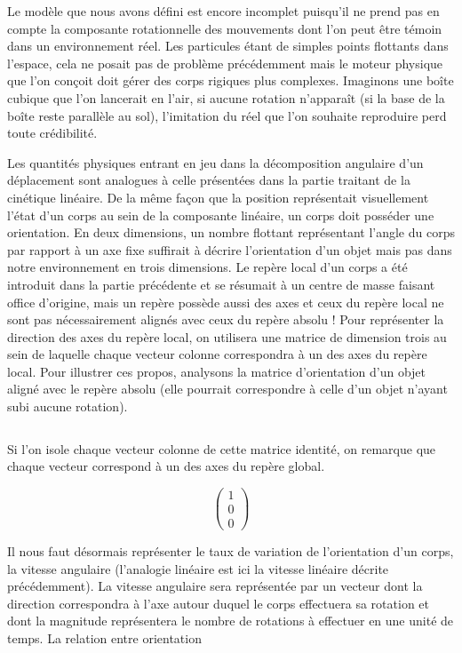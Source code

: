 Le modèle que nous avons défini est encore incomplet puisqu'il ne prend pas en compte la composante rotationnelle des mouvements dont l'on peut être témoin dans un environnement réel. Les particules étant de simples points flottants dans l'espace, cela ne posait pas de problème précédemment mais le moteur physique que l'on conçoit doit gérer des corps rigiques plus complexes. Imaginons une boîte cubique que l'on lancerait en l'air, si aucune rotation n'apparaît (si la base de la boîte reste parallèle au sol), l'imitation du réel que l'on souhaite reproduire perd toute crédibilité.

Les quantités physiques entrant en jeu dans la décomposition angulaire d'un déplacement sont analogues à celle présentées dans la partie traitant de la cinétique linéaire. De la même façon que la position représentait visuellement l'état d'un corps au sein de la composante linéaire, un corps doit posséder une orientation. En deux dimensions, un nombre flottant représentant l'angle du corps par rapport à un axe fixe suffirait à décrire l'orientation d'un objet mais pas dans notre environnement en trois dimensions. Le repère local d'un corps a été introduit dans la partie précédente et se résumait à un centre de masse faisant office d'origine, mais un repère possède aussi des axes et ceux du repère local ne sont pas nécessairement alignés avec ceux du repère absolu ! Pour représenter la direction des axes du repère local, on utilisera une matrice de dimension trois au sein de laquelle chaque vecteur colonne correspondra à un des axes du repère local. Pour illustrer ces propos, analysons la matrice d'orientation d'un objet aligné avec le repère absolu (elle pourrait correspondre à celle d'un objet n'ayant subi aucune rotation).

\[
\]

Si l'on isole chaque vecteur colonne de cette matrice identité, on remarque que chaque vecteur correspond à un des axes du repère global.

\[
\begin{pmatrix}
  1 \\
  0 \\
  0
\end{pmatrix}
\]

Il nous faut désormais représenter le taux de variation de l'orientation d'un corps, la vitesse angulaire (l'analogie linéaire est ici la vitesse linéaire décrite précédemment). La vitesse angulaire sera représentée par un vecteur dont la direction correspondra à l'axe autour duquel le corps effectuera sa rotation et dont la magnitude représentera le nombre de rotations à effectuer en une unité de temps. La relation entre orientation
